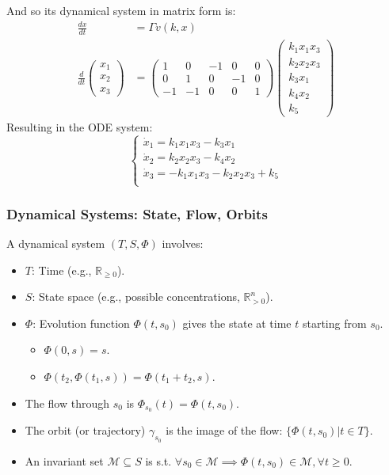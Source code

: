 \documentclass[aspectratio=169]{beamer}
\begin{document}
\begin{frame}
And so its dynamical system in matrix form is:
\begin{align*}
	\frac{dx}{dt} &= \Gamma v(k,x) \\
	\frac{d}{dt}
	\begin{pmatrix*}
		x_1	\\
		x_2	\\
		x_3	
	\end{pmatrix*} &=
	\begin{pmatrix*}
		1 & 0 & -1 & 0 & 0 \\
		0 & 1 & 0 & -1 & 0 \\
		-1 & -1 & 0 & 0 & 1
	\end{pmatrix*}
	\begin{pmatrix}
		k_1 x_1 x_3 \\
		k_2 x_2 x_3 \\
		k_3 x_1 \\
		k_4 x_2 \\
		k_5
	\end{pmatrix}
\end{align*}
Resulting in the ODE system:
\[
	\begin{cases*}
		\dot{x}_1 = k_1 x_1 x_3 - k_3x_1  \\
		\dot{x}_2 = k_2 x_2 x_3 - k_4 x_2  \\
		\dot{x}_3 = -k_1 x_1 x_3 - k_2 x_2 x_3 + k_5 \\
	\end{cases*}
\]
\end{frame}

\begin{frame}{\insertsectionhead}
\frametitle{Dynamical Systems: State, Flow, Orbits}
A dynamical system $(T, S, \Phi)$ involves:
\begin{itemize}
	\item $T$: Time (e.g., $\mathbb{R}_{\ge 0}$).
	\item $S$: State space (e.g., possible concentrations, $\mathbb{R}^n_{>0}$).
	\item $\Phi$: Evolution function $\Phi(t, s_0)$ gives the state at time $t$ starting from $s_0$.
		\begin{itemize}
			\item $\Phi(0, s) = s$.
			\item $\Phi(t_2, \Phi(t_1, s)) = \Phi(t_1+t_2, s)$.
		\end{itemize}
	\item The \alert{flow} through $s_0$ is $\Phi_{s_0}(t) = \Phi(t,s_0)$.
	\item The \alert{orbit} (or trajectory) $\gamma_{s_0}$ is the image of the flow: $\{\Phi(t,s_0) | t \in T\}$.
	\item An \alert{invariant set} $\mathcal{M} \subseteq S$ is s.t. $\forall s_0 \in \mathcal{M} \implies \Phi(t,s_0) \in \mathcal{M}, \forall t \ge 0$.
\end{itemize}
\end{frame}
\end{document}
